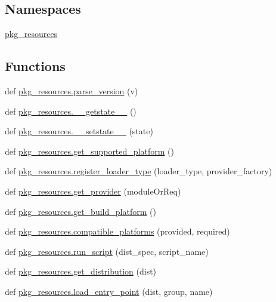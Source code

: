 \subsection*{Namespaces}
\begin{DoxyCompactItemize}
\item 
 \hyperlink{namespacepkg__resources}{pkg\+\_\+resources}
\end{DoxyCompactItemize}
\subsection*{Functions}
\begin{DoxyCompactItemize}
\item 
def \hyperlink{namespacepkg__resources_acedac33b376a00a24ba64609617054d8}{pkg\+\_\+resources.\+parse\+\_\+version} (v)
\item 
def \hyperlink{namespacepkg__resources_a8bf54875ad4040265a3eac20e4eca14f}{pkg\+\_\+resources.\+\_\+\+\_\+getstate\+\_\+\+\_\+} ()
\item 
def \hyperlink{namespacepkg__resources_ae71bb9a1aa190cf1f23a4474ea1e638b}{pkg\+\_\+resources.\+\_\+\+\_\+setstate\+\_\+\+\_\+} (state)
\item 
def \hyperlink{namespacepkg__resources_a2ad1c6a7e428d89c722264e41cc9214e}{pkg\+\_\+resources.\+get\+\_\+supported\+\_\+platform} ()
\item 
def \hyperlink{namespacepkg__resources_aebea9035d439bfb9fd4ec75e1c2d2003}{pkg\+\_\+resources.\+register\+\_\+loader\+\_\+type} (loader\+\_\+type, provider\+\_\+factory)
\item 
def \hyperlink{namespacepkg__resources_ae7d5476e7cb36e118cf324cda5f2ace5}{pkg\+\_\+resources.\+get\+\_\+provider} (module\+Or\+Req)
\item 
def \hyperlink{namespacepkg__resources_a428a5468ed29d9fc3a2c9c7b3c69d4d8}{pkg\+\_\+resources.\+get\+\_\+build\+\_\+platform} ()
\item 
def \hyperlink{namespacepkg__resources_aa77948d4629271731ceb9154c30c65cd}{pkg\+\_\+resources.\+compatible\+\_\+platforms} (provided, required)
\item 
def \hyperlink{namespacepkg__resources_a37b3befc5c87a30dc05883907e765d4d}{pkg\+\_\+resources.\+run\+\_\+script} (dist\+\_\+spec, script\+\_\+name)
\item 
def \hyperlink{namespacepkg__resources_a2855f6a8b340925bb37a05cca44c6858}{pkg\+\_\+resources.\+get\+\_\+distribution} (dist)
\item 
def \hyperlink{namespacepkg__resources_a2bc38c681dc970a15ff89f47bedd624a}{pkg\+\_\+resources.\+load\+\_\+entry\+\_\+point} (dist, group, name)

\end{DoxyCompactItemize}
